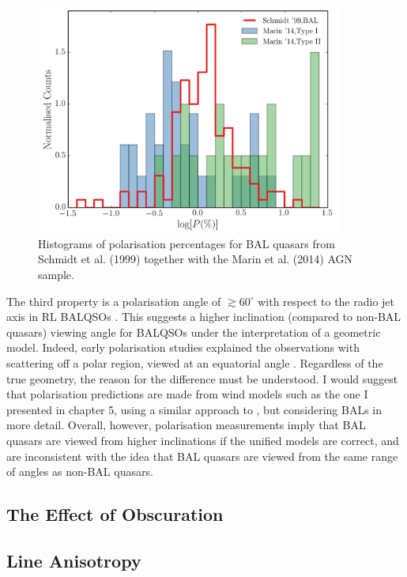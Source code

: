 \begin{figure}
\centering
\includegraphics[width=0.9\textwidth]{figures/ewpaper/hist_p2.png}
\caption
{
Histograms of polarisation percentages 
for BAL quasars from Schmidt et al. (1999) together with the 
Marin et al. (2014) AGN sample. 
}
\label{fig:bal_polarisation}
\end{figure}

The third property is a polarisation angle of $\gtrsim60^\circ$ with respect
to the radio jet axis in RL BALQSOs \citep[][and references therein]{brotherton2006}.
This suggests a higher inclination (compared to non-BAL quasars)
viewing angle for BALQSOs under the interpretation of a geometric model. Indeed,
early polarisation studies explained the observations with scattering 
off a polar region, viewed at an equatorial angle 
\citep[e.g.][]{goodrich1995, cohen1995,lamy2004}. Regardless of
the true geometry, the reason for the difference must be understood.
I would suggest that polarisation predictions are made from wind
models such as the one I presented in chapter 5, using a similar
approach to \cite{marin2013}, but considering BALs in more detail. 
Overall, however, polarisation measurements imply that BAL quasars are viewed
from higher inclinations if the unified models are correct, and are 
inconsistent with the idea that BAL quasars are viewed from the same range
of angles as non-BAL quasars.




\subsection{The Effect of Obscuration}

\subsection{Line Anisotropy}
\label{sec:line_aniso}

